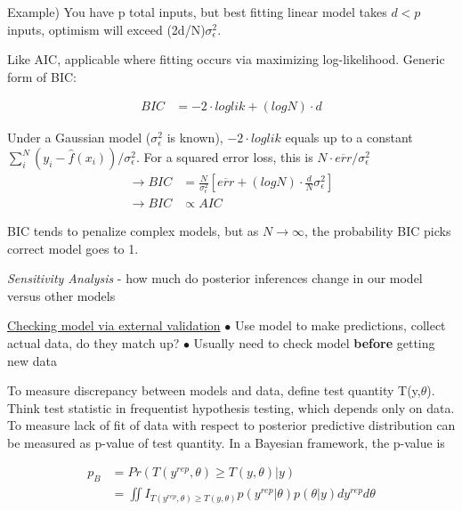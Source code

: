 \documentclass[11pt]{labbook}
\begin{document}
Example) You have p total inputs, but best fitting linear model takes $d<p$ inputs, optimism will exceed (2d/N)$\sigma_{\epsilon}^{2}$.

Like AIC, applicable where fitting occurs via maximizing log-likelihood. Generic form of BIC:

\begin{align*}
BIC &= -2 \cdot loglik + \left(log N\right) \cdot d
\end{align*}

Under a Gaussian model ($\sigma_{\epsilon}^2$ is known), $-2 \cdot loglik$ equals up to a constant $\sum_i^N(y_i -\hat{f}(x_i))/\sigma_{\epsilon}^2$. For a squared error loss, this is $N \cdot \overline{err}/\sigma_{\epsilon}^2$
\begin{align*}
\rightarrow BIC &= \frac{N}{\sigma_{\epsilon}^2}\left[\overline{err} + \left(log N\right) \cdot \frac{d}{N}\sigma_{\epsilon}^2\right] \\
\rightarrow BIC &\propto AIC
\end{align*}

BIC tends to penalize complex models, but as $N \rightarrow \infty$, the probability BIC picks correct model goes to 1.




\textit{Sensitivity Analysis} - how much do posterior inferences change in our model versus other models


\underline{Checking model via external validation} \newline
$\bullet$	Use model to make predictions, collect actual data, do they match up? \newline
$\bullet$ Usually need to check model \textbf{before} getting new data


To measure discrepancy between models and data, define test quantity T(y,$\theta$). Think test statistic in frequentist hypothesis testing, which depends only on data. To measure lack of fit of data with respect to posterior predictive distribution can be measured as p-value of test quantity. In a Bayesian framework, the p-value is 

\begin{align*}
p_B &= Pr(T(y^{rep},\theta) \geq T(y,\theta)|y)\\
&= \iint{I_{T(y^{rep},\theta) \geq T(y,\theta)}p(y^{rep}|\theta)p(\theta|y)dy^{rep}d\theta}
\end{align*}
\end{document}
